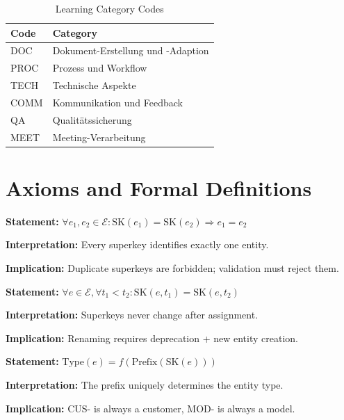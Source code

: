 \begin{table}[htbp]
\centering
\caption{Learning Category Codes}
\label{tab:learning-codes}
\begin{tabular}{@{}ll@{}}
\toprule
\textbf{Code} & \textbf{Category} \\
\midrule
DOC & Dokument-Erstellung und -Adaption \\
PROC & Prozess und Workflow \\
TECH & Technische Aspekte \\
COMM & Kommunikation und Feedback \\
QA & Qualitätssicherung \\
MEET & Meeting-Verarbeitung \\
\bottomrule
\end{tabular}
\end{table}


\section{Axioms and Formal Definitions}
\label{sec:superkey-axioms}

\begin{tcolorbox}[colback=gray!5!white, colframe=gray!75!black,
    title=Axiom SK-1: Uniqueness]
\textbf{Statement:} $\forall e_1, e_2 \in \mathcal{E}: \text{SK}(e_1) = \text{SK}(e_2) \Rightarrow e_1 = e_2$

\textbf{Interpretation:} Every superkey identifies exactly one entity.

\textbf{Implication:} Duplicate superkeys are forbidden; validation must reject them.
\end{tcolorbox}

\begin{tcolorbox}[colback=gray!5!white, colframe=gray!75!black,
    title=Axiom SK-2: Immutability]
\textbf{Statement:} $\forall e \in \mathcal{E}, \forall t_1 < t_2: \text{SK}(e, t_1) = \text{SK}(e, t_2)$

\textbf{Interpretation:} Superkeys never change after assignment.

\textbf{Implication:} Renaming requires deprecation + new entity creation.
\end{tcolorbox}

\begin{tcolorbox}[colback=gray!5!white, colframe=gray!75!black,
    title=Axiom SK-3: Prefix Determinism]
\textbf{Statement:} $\text{Type}(e) = f(\text{Prefix}(\text{SK}(e)))$

\textbf{Interpretation:} The prefix uniquely determines the entity type.

\textbf{Implication:} CUS- is always a customer, MOD- is always a model.
\end{tcolorbox}

